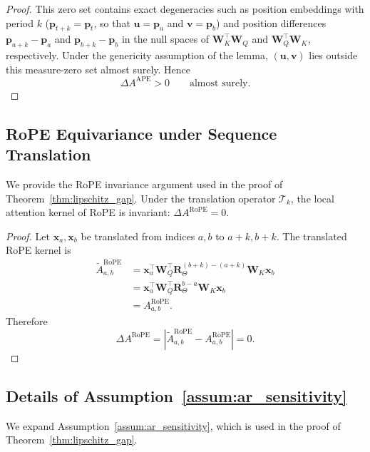 \begin{proof}
This zero set contains exact degeneracies such as position embeddings with period $k$ ($\mathbf{p}_{t+k}=\mathbf{p}_t$, so that $\mathbf{u}=\mathbf{p}_a$ and $\mathbf{v}=\mathbf{p}_b$) and position differences $\mathbf{p}_{a+k}-\mathbf{p}_a$ and $\mathbf{p}_{b+k}-\mathbf{p}_b$ in the null spaces of $\mathbf{W}_K^\top \mathbf{W}_Q$ and $\mathbf{W}_Q^\top \mathbf{W}_K$, respectively. Under the genericity assumption of the lemma, $(\mathbf{u},\mathbf{v})$ lies outside this measure-zero set almost surely. Hence
\begin{equation}
\Delta A^{\mathrm{APE}} > 0
\qquad \text{almost surely}.
\end{equation}
\end{proof}

\subsection{RoPE Equivariance under Sequence Translation}
\label{app:proof-rope-equivariance}

We provide the RoPE invariance argument used in the proof of Theorem~\ref{thm:lipschitz_gap}. Under the translation operator $\mathcal{T}_k$, the local attention kernel of RoPE is invariant: $\Delta A^{\mathrm{RoPE}} = 0$.

\begin{proof}
Let $\mathbf{x}_a,\mathbf{x}_b$ be translated from indices $a,b$ to $a+k,b+k$. The translated RoPE kernel is
\begin{align}
\widetilde{A}_{a,b}^{\mathrm{RoPE}}
&=
\mathbf{x}_a^\top \mathbf{W}_Q^\top
\mathbf{R}_\Theta^{(b+k)-(a+k)}
\mathbf{W}_K \mathbf{x}_b \\
&=
\mathbf{x}_a^\top \mathbf{W}_Q^\top
\mathbf{R}_\Theta^{b-a}
\mathbf{W}_K \mathbf{x}_b \\
&=
A_{a,b}^{\mathrm{RoPE}}.
\end{align}
Therefore
\begin{equation}
\Delta A^{\mathrm{RoPE}}
=
\left|
\widetilde{A}_{a,b}^{\mathrm{RoPE}} - A_{a,b}^{\mathrm{RoPE}}
\right|
=
0.
\end{equation}
\end{proof}

\subsection{Details of Assumption~\ref{assum:ar_sensitivity}}
\label{app:assumption-smoothness}

We expand Assumption~\ref{assum:ar_sensitivity}, which is used in the proof of Theorem~\ref{thm:lipschitz_gap}.

